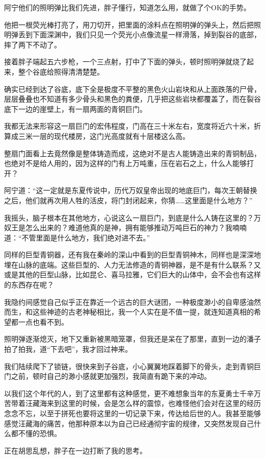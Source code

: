 阿宁他们的照明弹比我们先进，胖子懂行，知道怎么用，就做了个OK的手势。

他把一根荧光棒打亮了，用刀切开，把里面的涂料点在照明弹的弹头上，然后把照明弹丢到下面深渊中，我们只见一个荧光小点像流星一样滑落，掉到裂谷的底部，摔了两下不动了。

接着胖子端起五六步枪，一个三点射，打中了下面的弹头，顿时照明弹就烧了起来，整个谷底给照得清清楚楚。

确实已经到达了谷底，底下全是极度不平整的黑色火山岩块和从上面跌落的尸骨，层层叠叠也不知道有多少骨头和黑色的粪便，几乎把这些岩块都覆盖了，而在裂谷底下一边的崖壁上，有一扇两面的青铜巨门。

我都无法来形容这一扇巨门的宏伟程度，门高在三十米左右，宽度将近六十米，折算成三米一层的现代楼房，这门光高度就有十层楼这么高。

整扇门面看上去竟然像是整体铸造而成，这绝对不是古人能铸造出来的青铜制品，也绝对不是给人用的，因为这样的门有上万吨重，压在岩石之上，什么人能够打开？

阿宁道：“这一定就是东夏传说中，历代万奴皇帝出现的地底巨门，每次王朝替换之后，他们就再次用人牲的活皮，将门封闭起来，你猜……这里面是什么地方？”

我摇头，脑子根本在其他地方，心说这么一扇巨门，到底是什么人铸在这里的？万奴王是怎么出来的？难道他真的是神，拥有能够推动万吨巨石的神力？我喃喃道：“不管里面是什么地方，我们绝对进不去。”

同样的巨型青铜器，还有我在秦岭的深山中看到的巨型青铜神木，同样也是深深地埋在山脉的底端。这些巨型的、人力无法修造的青铜神器，是不是有什么联系？又或是其他的巨型山脉，比如昆仑、喜马拉雅，它们巨大的山体中，会不会也有这样的东西存在呢？

我隐约间感觉自己似乎正在靠近一个远古的巨大谜团，一种极度渺小的自卑感油然而生，和这些神迹的古老神秘相比，我一个人实在是不值一提，就连知道真相的希望都一点也看不到。

照明弹逐渐熄灭，地下又重新被黑暗笼罩，但我还是呆在了那里，直到一边的潘子拍了拍我，道“下去吧”，我才回过神来。

我们陆续爬下了锁链，很快来到子谷底，小心翼翼地踩着脚下的骨头，走到青铜巨门之前，顿时自己的渺小感就更加强烈，我简直有跪下来的冲动。

以我们这个年代的人，到了这里都有这种感觉，更不难想象当年的东夏勇士千辛万苦带着汪藏海来到这里的时候，会是怎么样的震惊，也难怪他们会对在这里的经历念念不忘，以至于拼死也要将这里的一切记录下来，传达给后世的人。我甚至能够感觉汪藏海的痛苦，他那种原本以为自己已经通彻宇宙的规律，又突然发现自己什么都不懂的恐惧。

正在胡思乱想，胖子在一边打断了我的思考。

